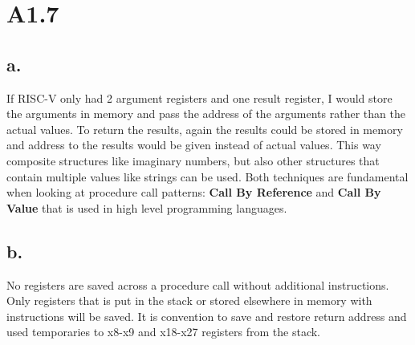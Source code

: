 \section*{A1.7}
\subsection*{a.}
If RISC-V only had 2 argument registers and one result register, I would store the arguments in memory and pass the address of the arguments rather than the actual values.
To return the results, again the results could be stored in memory and address to the results would be given instead of actual values. 
This way composite structures like imaginary numbers, but also other structures that contain multiple values like strings can be used.
Both techniques are fundamental when looking at procedure call patterns: \textbf{Call By Reference} and \textbf{Call By Value} that is used in high level programming languages.

\subsection*{b.}
No registers are saved across a procedure call without additional instructions.
Only registers that is put in the stack or stored elsewhere in memory with instructions will be saved.
It is convention to save and restore return address and used temporaries to x8-x9 and x18-x27 registers from the stack.